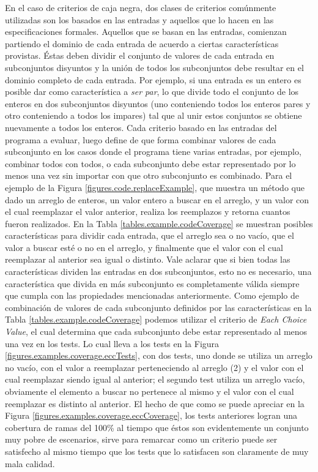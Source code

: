 En el caso de criterios de caja negra, dos clases de criterios com\'unmente utilizadas son los basados en las entradas y aquellos que lo hacen en las especificaciones formales. Aquellos que se basan en las entradas, comienzan partiendo el dominio de cada entrada de acuerdo a ciertas caracter\'isticas provistas. \'Estas deben dividir el conjunto de valores de cada entrada en subconjuntos disyuntos y la uni\'on de todos los subconjuntos debe resultar en el dominio completo de cada entrada. Por ejemplo, si una entrada es un entero es posible dar como caracter\'istica a \emph{ser par}, lo que divide todo el conjunto de los enteros en dos subconjuntos disyuntos (uno conteniendo todos los enteros pares y otro conteniendo a todos los impares) tal que al unir estos conjuntos se obtiene nuevamente a todos los enteros. Cada criterio basado en las entradas del programa a evaluar, luego define de que forma combinar valores de cada subconjunto en los casos donde el programa tiene varias entradas, por ejemplo, combinar todos con todos, o cada subconjunto debe estar representado por lo menos una vez sin importar con que otro subconjunto es combinado. Para el ejemplo de la Figura \ref{figures.code.replaceExample}, que muestra un m\'etodo que dado un arreglo de enteros, un valor entero a buscar en el arreglo, y un valor con el cual reemplazar el valor anterior, realiza los reemplazos y retorna cuantos fueron realizados. En la Tabla \ref{tables.example.codeCoverage} se muestran posibles caracter\'isticas para dividir cada entrada, que el arreglo sea o no vac\'io, que el valor a buscar est\'e o no en el arreglo, y finalmente que el valor con el cual reemplazar al anterior sea igual o distinto. Vale aclarar que si bien todas las caracter\'isticas dividen las entradas en dos subconjuntos, esto no es necesario, una caracter\'istica que divida en m\'as subconjunto es completamente v\'alida siempre que cumpla con las propiedades mencionadas anteriormente. Como ejemplo de combinaci\'on de valores de cada subconjunto definidos por las caracter\'isticas en la Tabla \ref{tables.example.codeCoverage} podemos utilizar el criterio de \emph{Each Choice Value}, el cual determina que cada subconjunto debe estar representado al menos una vez en los tests. Lo cual lleva a los tests en la Figura \ref{figures.examples.coverage.eccTests}, con dos tests, uno donde se utiliza un arreglo no vac\'io, con el valor a reemplazar perteneciendo al arreglo (2) y el valor con el cual reemplazar siendo igual al anterior; el segundo test utiliza un arreglo vac\'io, obviamente el elemento a buscar no pertenece al mismo y el valor con el cual reemplazar es distinto al anterior. El hecho de que como se puede apreciar en la Figura \ref{figures.examples.coverage.eccCoverage}, los tests anteriores logran una cobertura de ramas del 100\% al tiempo que \'estos son evidentemente un conjunto muy pobre de escenarios, sirve para remarcar como un criterio puede ser satisfecho al mismo tiempo que los tests que lo satisfacen son claramente de muy mala calidad.

